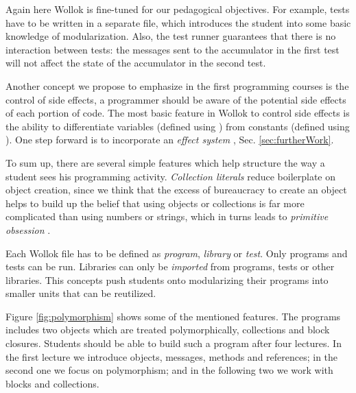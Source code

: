 Again here Wollok is fine-tuned for our pedagogical objectives.
For example, tests have to be written in a separate file, which introduces the student into some basic knowledge of modularization.
Also, the test runner guarantees that there is no interaction between tests: the messages sent to the accumulator in the first test will not affect the state of the accumulator in the second test.

\bigkip 
Another concept we propose to emphasize in the first programming courses is the control of side effects, 
\ie a programmer should be aware of the potential side effects of each portion of code.
The most basic feature in Wollok to control side effects is the ability to 
differentiate variables (defined using )
from constants (defined using ).
One step forward is to incorporate an \emph{effect system} \cite{nielson_type_1999}, \cf Sec. \ref{sec:furtherWork}.

\medskip
To sum up, there are several simple features which help structure the way a student sees his programming activity.
\emph{Collection literals} reduce boilerplate on object creation, 
since we think that the excess of bureaucracy to create an object helps to build up 
the belief that using objects or collections is far more complicated than using numbers or strings, which in turns leads to \emph{primitive obsession} \cite{fowler_refactoring:_1999}.

Each Wollok file has to be defined as \emph{program}, \emph{library} or \emph{test}.
Only programs and tests can be run. Libraries can only be \emph{imported} from programs, tests or other libraries.
This concepts push students onto modularizing their programs into smaller units that can be reutilized.

Figure \ref{fig:polymorphism} shows some of the mentioned features.
The programs includes two objects which are treated polymorphically, collections and block closures.
Students should be able to build such a program after four lectures.
In the first lecture we introduce objects, messages, methods and references;
in the second one we focus on polymorphism;
and in the following two we work with blocks and collections.

